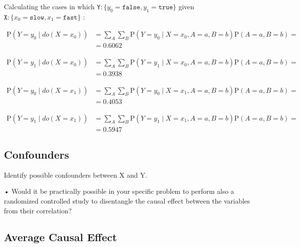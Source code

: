 \documentclass[a4paper,12pt]{article} %
\begin{document}
\noindent Calculating the cases in which $\mathtt{Y}: \{ y_0=\mathtt{false}, y_1=\mathtt{true}\}$ given $\mathtt{X}: \{ x_0=\mathtt{slow}, x_1=\mathtt{fast}\}$ :

\begin{equation*}\begin{aligned}
\text{P}(Y = y_0 \mid {do}(X = x_0)) & = \sum_{A}^{}\sum_{B}^{}	\text{P}(Y = y_0 \mid X = x_0, A = a, B = b)\text{P}(A = a, B = b) = \\
& = 0.6062	
\end{aligned}\end{equation*}

\begin{equation*}\begin{aligned}
\text{P}(Y = y_1 \mid {do}(X = x_0)) & = \sum_{A}^{}\sum_{B}^{}	\text{P}(Y = y_1 \mid X = x_0, A = a, B = b)\text{P}(A = a, B = b) = \\
& = 0.3938
\end{aligned}\end{equation*}

\begin{equation*}\begin{aligned}
\text{P}(Y = y_0 \mid {do}(X = x_1)) & = \sum_{A}^{}\sum_{B}^{}	\text{P}(Y = y_0 \mid X = x_1, A = a, B = b)\text{P}(A = a, B = b) = \\
& = 0.4053	
\end{aligned}\end{equation*}

\begin{equation*}\begin{aligned}
\text{P}(Y = y_1 \mid {do}(X = x_1)) & = \sum_{A}^{}\sum_{B}^{}	\text{P}(Y = y_1 \mid X = x_1, A = a, B = b)\text{P}(A = a, B = b) = \\
& = 0.5947
\end{aligned}\end{equation*}


\subsection*{Confounders}

Identify possible confounders between X and Y.



• Would it be practically possible in your specific problem to perform also a randomized controlled study to disentangle the causal effect between the variables from their correlation?

\subsection*{Average Causal Effect}
\end{document}
